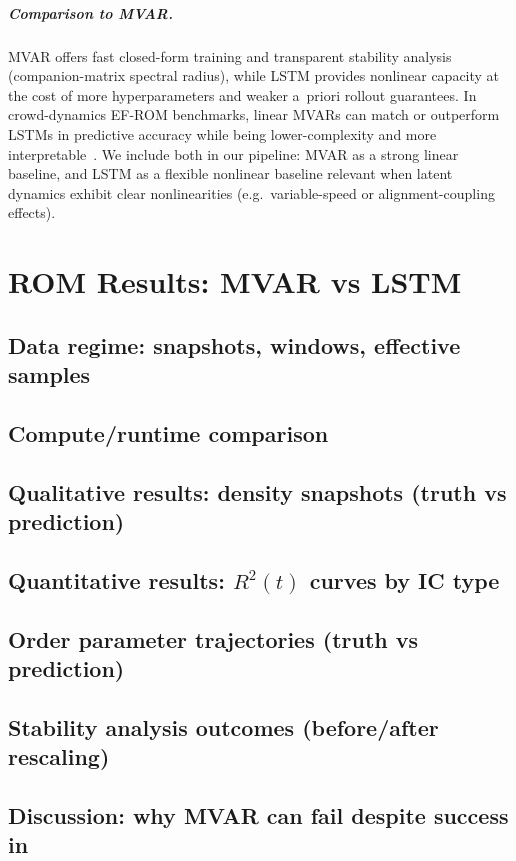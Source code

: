 \documentclass{report}
\theoremstyle{plain}
\theoremstyle{remark}
\numberwithin{equation}{section}              %
\begin{document}
\paragraph{Comparison to MVAR.}
MVAR offers fast closed-form training and transparent stability analysis
(companion-matrix spectral radius), while LSTM provides nonlinear
capacity at the cost of more hyperparameters and weaker a~priori rollout
guarantees.
In crowd-dynamics EF-ROM benchmarks, linear MVARs can match or outperform
LSTMs in predictive accuracy while being lower-complexity and more
interpretable~\cite{alvarez2025eqfree}.
We include both in our pipeline: MVAR as a strong linear baseline, and
LSTM as a flexible nonlinear baseline relevant when latent dynamics exhibit
clear nonlinearities (e.g.\ variable-speed or alignment-coupling effects).
 
%
\chapter{ROM Results: MVAR vs LSTM}
\section{Data regime: snapshots, windows, effective samples}
\section{Compute/runtime comparison}
\section{Qualitative results: density snapshots (truth vs prediction)}
\section{Quantitative results: $R^2(t)$ curves by IC type}
\section{Order parameter trajectories (truth vs prediction)}
\section{Stability analysis outcomes (before/after rescaling)}
\section{Discussion: why MVAR can fail despite success in \cite{alvarez2025eqfree}}
\end{document}
